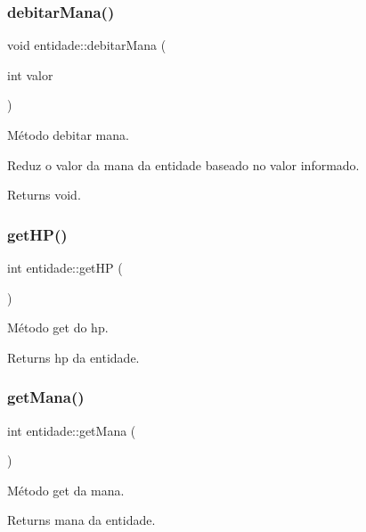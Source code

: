 \subsubsection{\texorpdfstring{debitar\+Mana()}{debitarMana()}}
{\footnotesize\ttfamily void entidade\+::debitar\+Mana (\begin{DoxyParamCaption}\item[{int}]{valor }\end{DoxyParamCaption})}



Método debitar mana. 

Reduz o valor da mana da entidade baseado no valor informado. \begin{DoxyReturn}{Returns}
void. 
\end{DoxyReturn}
\mbox{\label{classentidade_a1cbf074af4a67d31091265e677502b8e}} 
\subsubsection{\texorpdfstring{get\+H\+P()}{getHP()}}
{\footnotesize\ttfamily int entidade\+::get\+HP (\begin{DoxyParamCaption}{ }\end{DoxyParamCaption})}



Método get do hp. 

\begin{DoxyReturn}{Returns}
hp da entidade. 
\end{DoxyReturn}
\mbox{\label{classentidade_a0fa69d3b04a023da3d474e18619d27f7}} 
\subsubsection{\texorpdfstring{get\+Mana()}{getMana()}}
{\footnotesize\ttfamily int entidade\+::get\+Mana (\begin{DoxyParamCaption}{ }\end{DoxyParamCaption})}



Método get da mana. 

\begin{DoxyReturn}{Returns}
mana da entidade. 
\end{DoxyReturn}
\mbox{\label{classentidade_ae30252d3e3b769a7b56d994552bb2856}} 

